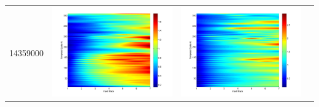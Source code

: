 \documentclass[11pt]{article}
\begin{document}
\begin{table}[H]
{\begin{tabular}{c  c   c   c  }
14359000&\begin{minipage}{.3\textwidth}\includegraphics[width=\linewidth]{resultgraph/14359000p.png}\end{minipage}
&\begin{minipage}{.3\textwidth}\includegraphics[width=\linewidth]{resultgraph/14359000pep.png}\end{minipage}

\end{tabular}}
\end{table}
\end{document}
